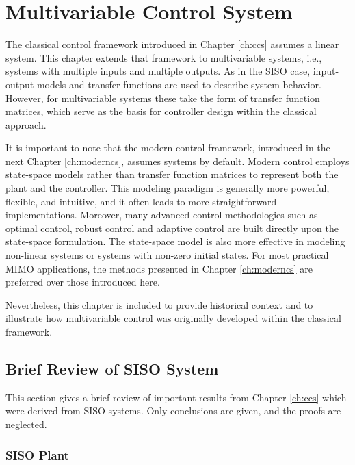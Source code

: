 \chapter{Multivariable Control System}

The classical control framework introduced in Chapter \ref{ch:ccs} assumes a linear  system. This chapter extends that framework to multivariable systems, i.e., systems with multiple inputs and multiple outputs. As in the SISO case, input-output models and transfer functions are used to describe system behavior. However, for multivariable systems these take the form of transfer function matrices, which serve as the basis for controller design within the classical approach.

It is important to note that the modern control framework, introduced in the next Chapter \ref{ch:moderncs}, assumes  systems by default. Modern control employs state-space models rather than transfer function matrices to represent both the plant and the controller. This modeling paradigm is generally more powerful, flexible, and intuitive, and it often leads to more straightforward implementations. Moreover, many advanced control methodologies such as optimal control, robust control and adaptive control are built directly upon the state-space formulation. The state-space model is also more effective in modeling non-linear systems or systems with non-zero initial states. For most practical MIMO applications, the methods presented in Chapter \ref{ch:moderncs} are preferred over those introduced here.

Nevertheless, this chapter is included to provide historical context and to illustrate how multivariable control was originally developed within the classical framework.

\section{Brief Review of SISO System}

This section gives a brief review of important results from Chapter \ref{ch:ccs} which were derived from SISO systems. Only conclusions are given, and the proofs are neglected.

\subsection{SISO Plant}


